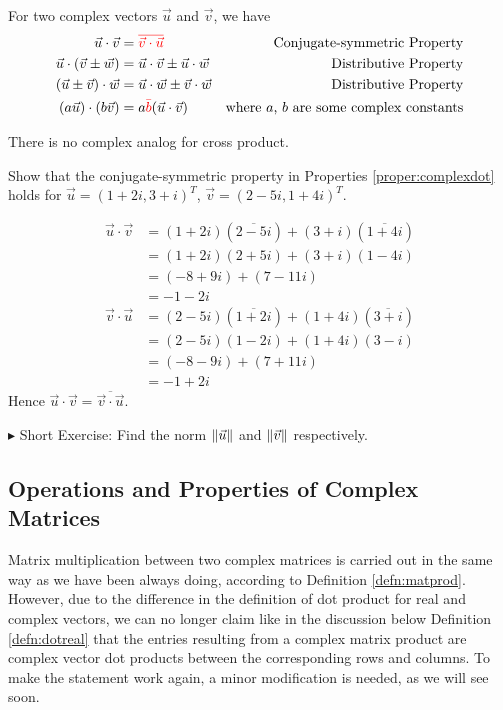 \begin{proper}
\label{proper:complexdot}
For two complex vectors $\vec{u}$ and $\vec{v}$, we have
\begin{align*}
\vec{u} \cdot \vec{v} &= \textcolor{red}{\overline{\vec{v} \cdot \vec{u}}} &\text{Conjugate-symmetric Property} \\
\vec{u} \cdot (\vec{v} \pm \vec{w}) &= \vec{u} \cdot \vec{v} \pm \vec{u} \cdot \vec{w} &\text{Distributive Property} \\
(\vec{u} \pm \vec{v}) \cdot \vec{w} &= \vec{u} \cdot \vec{w} \pm \vec{v} \cdot \vec{w} &\text{Distributive Property} \\
(a\vec{u}) \cdot (b\vec{v}) &= a\textcolor{red}{\bar{b}}(\vec{u} \cdot \vec{v}) &\text{where $a$, $b$ are some complex constants}    
\end{align*}
\end{proper}
There is no complex analog for cross product.
\begin{exmp}
Show that the conjugate-symmetric property in Properties \ref{proper:complexdot} holds for $\vec{u} = (1+2i, 3+i)^T$, $\vec{v} = (2-5i, 1+4i)^T$.
\end{exmp}
\begin{solution}
\begin{align*}
\vec{u} \cdot \vec{v} &= (1+2i)(\overline{2-5i}) + (3+i)(\overline{1+4i}) \\
&= (1+2i)(2+5i) + (3+i)(1-4i) \\
&= (-8+9i) + (7-11i) \\
&= -1-2i 
\end{align*}
\begin{align*}
\vec{v} \cdot \vec{u} &= (2-5i)(\overline{1+2i}) + (1+4i)(\overline{3+i}) \\
&= (2-5i)(1-2i) + (1+4i)(3-i) \\
&= (-8-9i) + (7+11i) \\
&= -1+2i 
\end{align*}
Hence $\vec{u} \cdot \vec{v} = \overline{\vec{v} \cdot \vec{u}}$.
\end{solution}

$\blacktriangleright$ Short Exercise: Find the norm $\norm{\vec{u}}$ and $\norm{\vec{v}}$ respectively.\footnotemark

\subsection{Operations and Properties of Complex Matrices}
Matrix multiplication between two complex matrices is carried out in the same way as we have been always doing, according to Definition \ref{defn:matprod}. However, due to the difference in the definition of dot product for real and complex vectors, we can no longer claim like in the discussion below Definition \ref{defn:dotreal} that the entries resulting from a complex matrix product are complex vector dot products between the corresponding rows and columns. To make the statement work again, a minor modification is needed, as we will see soon.

